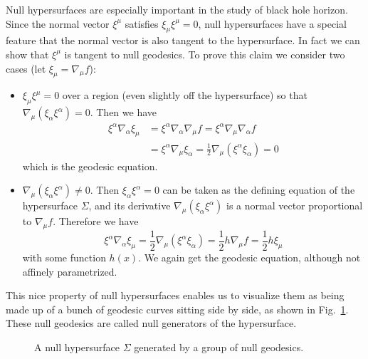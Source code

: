 \documentclass[11pt,table]{article}
\begin{document}
Null hypersurfaces are especially important in the study of black hole horizon. Since the normal vector $\xi^{\mu}$ satisfies $\xi_{\mu} \xi^{\mu}=0$, null hypersurfaces have a special feature that the normal vector is also tangent to the hypersurface. In fact we can show that $\xi^{\mu}$ is tangent to null geodesics. To prove this claim we consider two cases (let $\xi_{\mu}=\nabla_{\mu}f$):
\begin{itemize}
\item $\xi_{\mu}\xi^{\mu}=0$ over a region (even slightly off the hypersurface) so that $\nabla_{\mu}(\xi_{\alpha}\xi^{\alpha})=0$. Then we have
\begin{equation}
\begin{split}
\xi^{\alpha}\nabla_{\alpha}\xi_{\mu} &= \xi^{\alpha}\nabla_{\alpha}\nabla_{\mu}f = \xi^{\alpha}\nabla_{\mu}\nabla_{\alpha}f \\
&= \xi^{\alpha}\nabla_{\mu}\xi_{\alpha} = \frac 12 \nabla_{\mu}(\xi^{\alpha}\xi_{\alpha}) = 0
\end{split}
\end{equation}
which is the geodesic equation.
\item $\nabla_{\mu}(\xi_{\alpha}\xi^{\alpha})\ne 0$. Then $\xi_{\alpha}\xi^{\alpha}=0$ can be taken as the defining equation of the hypersurface $\Sigma$, and its derivative $\nabla_{\mu}(\xi_{\alpha}\xi^{\alpha})$ is a normal vector proportional to $\nabla_{\mu}f$. Therefore we have
\begin{equation}
\xi^{\alpha}\nabla_{\alpha}\xi_{\mu} = \frac 12 \nabla_{\mu}(\xi^{\alpha}\xi_{\alpha}) = \frac 12 h\nabla_{\mu}f = \frac 12 h\xi_\mu
\end{equation}
with some function $h(x)$. We again get the geodesic equation, although not affinely parametrized.
\end{itemize}

This nice property of null hypersurfaces enables us to visualize them as being made up of a bunch of geodesic curves sitting side by side, as shown in Fig.~\ref{fig:null_generators}. These null geodesics are called null generators of the hypersurface.

\begin{figure}[H]
\centering
{}
\caption{A null hypersurface $\Sigma$ generated by a group of null geodesics.}
\label{fig:null_generators}
\end{figure}
\end{document}

